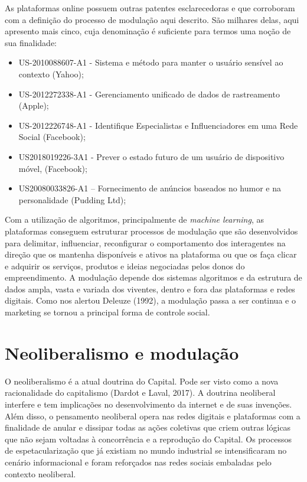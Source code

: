 As plataformas online possuem outras patentes esclarecedoras e que
corroboram com a definição do processo de modulação aqui descrito. São
milhares delas, aqui apresento mais cinco, cuja denominação é suficiente
para termos uma noção de sua finalidade:

\begin{itemize}
\item
  US-2010088607-A1 - Sistema e método para manter o usuário sensível ao
  contexto (Yahoo);
\item
  US-2012272338-A1 - Gerenciamento unificado de dados de rastreamento
  (Apple);
\item
  US-2012226748-A1 - Identifique Especialistas e Influenciadores em uma
  Rede Social (Facebook);
\item
  US2018019226-3A1 - Prever o estado futuro de um usuário de dispositivo
  móvel, (Facebook);
\item
  US20080033826-A1 -- Fornecimento de anúncios baseados no humor e na
  personalidade (Pudding Ltd);
\end{itemize}

Com a utilização de algoritmos, principalmente de \emph{machine
learning}, as plataformas conseguem estruturar processos de modulação
que são desenvolvidos para delimitar, influenciar, reconfigurar o
comportamento dos interagentes na direção que os mantenha disponíveis e
ativos na plataforma ou que os faça clicar e adquirir os serviços,
produtos e ideias negociadas pelos donos do empreendimento. A modulação
depende dos sistemas algoritmos e da estrutura de dados ampla, vasta e
variada dos viventes, dentro e fora das plataformas e redes digitais.
Como nos alertou Deleuze (1992), a modulação passa a ser continua e o
marketing se tornou a principal forma de controle social.

\section{Neoliberalismo e modulação}

O neoliberalismo é a atual doutrina do Capital. Pode ser visto como a
nova racionalidade do capitalismo (Dardot e Laval, 2017). A doutrina
neoliberal interfere e tem implicações no desenvolvimento da internet e
de suas invenções. Além disso, o pensamento neoliberal opera nas redes
digitais e plataformas com a finalidade de anular e dissipar todas as
ações coletivas que criem outras lógicas que não sejam voltadas à
concorrência e a reprodução do Capital. Os processos de
espetacularização que já existiam no mundo industrial se intensificaram
no cenário informacional e foram reforçados nas redes sociais embaladas
pelo contexto neoliberal.

